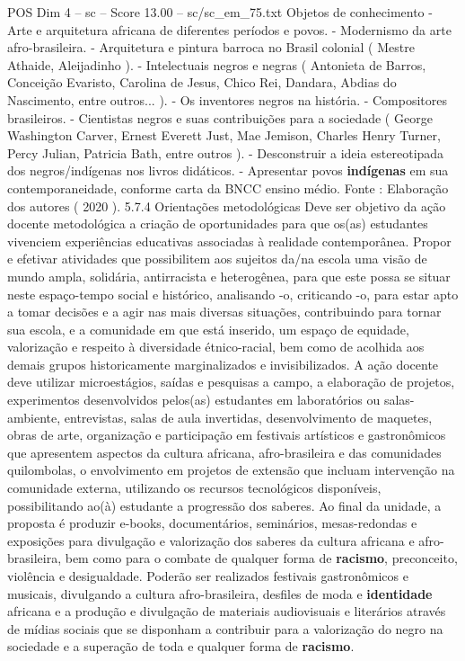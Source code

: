 \begin{textsample}{POS Dim 4 – sc – Score 13.00 – sc/sc\_em\_75.txt}
Objetos de conhecimento - Arte e arquitetura africana de diferentes períodos e povos. - Modernismo da arte afro-brasileira. - Arquitetura e pintura barroca no Brasil colonial ( Mestre Athaide, Aleijadinho ). - Intelectuais negros e negras ( Antonieta de Barros, Conceição Evaristo, Carolina de Jesus, Chico Rei, Dandara, Abdias do Nascimento, entre outros... ). - Os inventores negros na história. - Compositores brasileiros. - Cientistas negros e suas contribuições para a sociedade ( George Washington Carver, Ernest Everett Just, Mae Jemison, Charles Henry Turner, Percy Julian, Patricia Bath, entre outros ). - Desconstruir a ideia estereotipada dos negros/indígenas nos livros didáticos. - Apresentar povos \textbf{indígenas} em sua contemporaneidade, conforme carta da BNCC ensino médio.
Fonte : Elaboração dos autores ( 2020 ). 5.7.4 Orientações metodológicas Deve ser objetivo da ação docente metodológica a criação de oportunidades para que os(as) estudantes vivenciem experiências educativas associadas à realidade contemporânea.
Propor e efetivar atividades que possibilitem aos sujeitos da/na escola uma visão de mundo ampla, solidária, antirracista e heterogênea, para que este possa se situar neste espaço-tempo social e histórico, analisando -o, criticando -o, para estar apto a tomar decisões e a agir nas mais diversas situações, contribuindo para tornar sua escola, e a comunidade em que está inserido, um espaço de equidade, valorização e respeito à diversidade étnico-racial, bem como de acolhida aos demais grupos historicamente marginalizados e invisibilizados.
A ação docente deve utilizar microestágios, saídas e pesquisas a campo, a elaboração de projetos, experimentos desenvolvidos pelos(as) estudantes em laboratórios ou salas-ambiente, entrevistas, salas de aula invertidas, desenvolvimento de maquetes, obras de arte, organização e participação em festivais artísticos e gastronômicos que apresentem aspectos da cultura africana, afro-brasileira e das comunidades quilombolas, o envolvimento em projetos de extensão que incluam intervenção na comunidade externa, utilizando os recursos tecnológicos disponíveis, possibilitando ao(à) estudante a progressão dos saberes.
Ao final da unidade, a proposta é produzir e-books, documentários, seminários, mesas-redondas e exposições para divulgação e valorização dos saberes da cultura africana e afro-brasileira, bem como para o combate de qualquer forma de \textbf{racismo}, preconceito, violência e desigualdade.
Poderão ser realizados festivais gastronômicos e musicais, divulgando a cultura afro-brasileira, desfiles de moda e \textbf{identidade} africana e a produção e divulgação de materiais audiovisuais e literários através de mídias sociais que se disponham a contribuir para a valorização do negro na sociedade e a superação de toda e qualquer forma de \textbf{racismo}.

\end{textsample}
